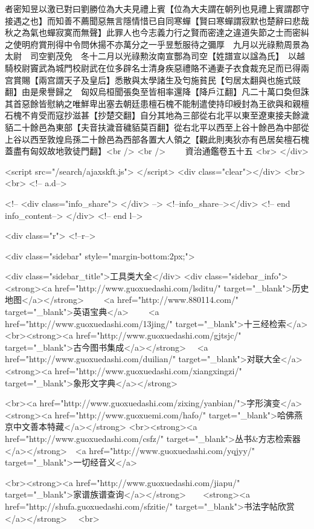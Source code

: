 者密知昱以激已對曰劉勝位為大夫見禮上賓【位為大夫謂在朝列也見禮上賓謂郡守接遇之也】而知善不薦聞惡無言隱情惜已自同寒蟬【賢曰寒蟬謂寂默也楚辭曰悲哉秋之為氣也蟬寂寞而無聲】此罪人也今志義力行之賢而密達之違道失節之士而密糾之使明府賞刑得中令問休揚不亦萬分之一乎昱慙服待之彌厚　九月以光祿勲周景為太尉　司空劉茂免　冬十二月以光祿勲汝南宣酆為司空【姓譜宣以諡為氏】　以越騎校尉竇武為城門校尉武在位多辟名士清身疾惡禮賂不通妻子衣食裁充足而已得兩宫賞賜【兩宫謂天子及皇后】悉散與太學諸生及匄施貧民【匄居太翻與也施式豉翻】由是衆譽歸之　匈奴烏桓聞張奐至皆相率還降【降戶江翻】凡二十萬口奐但誅其首惡餘皆慰納之唯鮮卑出塞去朝廷患檀石槐不能制遣使持印綬封為王欲與和親檀石槐不肯受而寇抄滋甚【抄楚交翻】自分其地為三部從右北平以東至遼東接夫餘濊貊二十餘邑為東部【夫音扶濊音穢貊莫百翻】從右北平以西至上谷十餘邑為中部從上谷以西至敦煌烏孫二十餘邑為西部各置大人領之【觀此則夷狄亦有邑居矣檀石槐蓋盡有匈奴故地敦徒門翻】<br />
<br />
　　資治通鑑卷五十五  <br>
   </div> 

<script src="/search/ajaxskft.js"> </script>
 <div class="clear"></div>
<br>
<br>
 <!-- a.d-->

 <!--
<div class="info_share">
</div> 
-->
 <!--info_share--></div>   <!-- end info_content-->
  </div> <!-- end l-->

<div class="r">   <!--r-->



<div class="sidebar"  style="margin-bottom:2px;">

 
<div class="sidebar_title">工具类大全</div>
<div class="sidebar_info">
<strong><a href="http://www.guoxuedashi.com/lsditu/" target="_blank">历史地图</a></strong>　　
<a href="http://www.880114.com/" target="_blank">英语宝典</a>　　
<a href="http://www.guoxuedashi.com/13jing/" target="_blank">十三经检索</a>　
<br><strong><a href="http://www.guoxuedashi.com/gjtsjc/" target="_blank">古今图书集成</a></strong>　
<a href="http://www.guoxuedashi.com/duilian/" target="_blank">对联大全</a>　<strong><a href="http://www.guoxuedashi.com/xiangxingzi/" target="_blank">象形文字典</a></strong>　

<br><a href="http://www.guoxuedashi.com/zixing/yanbian/">字形演变</a>　　<strong><a href="http://www.guoxuemi.com/hafo/" target="_blank">哈佛燕京中文善本特藏</a></strong>
<br><strong><a href="http://www.guoxuedashi.com/csfz/" target="_blank">丛书&方志检索器</a></strong>　<a href="http://www.guoxuedashi.com/yqjyy/" target="_blank">一切经音义</a>　　

<br><strong><a href="http://www.guoxuedashi.com/jiapu/" target="_blank">家谱族谱查询</a></strong>　　<strong><a href="http://shufa.guoxuedashi.com/sfzitie/" target="_blank">书法字帖欣赏</a></strong>　
<br>

